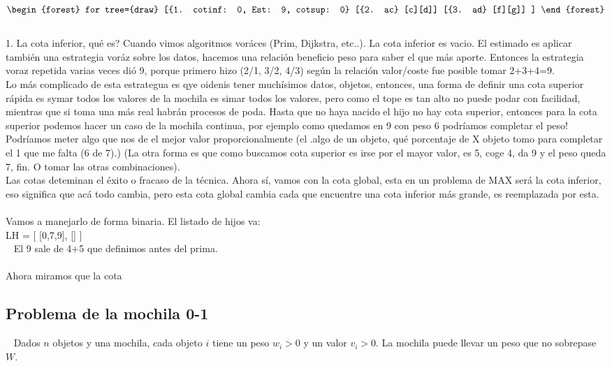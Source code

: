 \begin{example}
	$$\begin{forest}
			for tree={draw}
			[{1. cotinf: 0, Est: 9, cotsup: 0}
				[{2. ac}
						[c][d]]
				[{3. ad}
						[f][g]]
			]
		\end{forest}
	$$
	~\\
	1. La cota inferior, qué es? Cuando vimos algoritmos voráces (Prim, Dijkstra, etc..). La cota inferior es vacio.
	El estimado es aplicar también una estrategia voráz sobre los datos, hacemos una relación beneficio peso para saber el que más aporte. Entonces la estrategia voraz repetida varias veces dió 9, porque primero hizo (2/1, 3/2, 4/3) según la relación valor/coste fue posible tomar 2+3+4=9.
	~\\
	Lo más complicado de esta estrategua es qye oidenis tener muchísimos datos, objetos, entonces, una forma de definir una cota superior rápida es symar todos los valores de la mochila es simar todos los valores, pero como el tope es tan alto no puede podar con facilidad, mientras que si toma una más real habrán procesos de poda. Hasta que no haya nacido el hijo no hay cota superior, entonces para la cota superior podemos hacer un caso de la mochila continua, por ejemplo como quedamos en 9 con peso 6 podríamos completar el peso! Podríamos meter algo que nos de el mejor valor proporcionalmente (el .algo de un objeto, qué porcentaje de X objeto tomo para completar el 1 que me falta (6 de 7).) (La otra forma es que como buscamos cota superior es irse por el mayor valor, es 5, coge 4, da 9 y el peso queda 7, fin. O tomar las otras combinaciones).
	~\\
	Las cotas deteminan el éxito o fracaso de la técnica.
	Ahora sí, vamos con la cota global, esta en un problema de MAX será la cota inferior, eso significa que acá todo cambia, pero esta cota global cambia cada que encuentre una cota inferior más grande, es reemplazada por esta.
	~\\
	Vamos a manejarlo de forma binaria.
	El listado de hijos va:
	~\\
	LH = [ [0,7,9], [] ]\\~
	El 9 sale de 4+5 que definimos antes del prima.
	\\~\\
	Ahora miramos que la cota
\end{example}


\subsection{Problema de la mochila 0-1}~
Dados $n$ objetos y una mochila, cada objeto $i$ tiene un peso $w_i>0$ y un valor $v_i>0$. La mochila puede llevar un peso que no sobrepase $W$.

